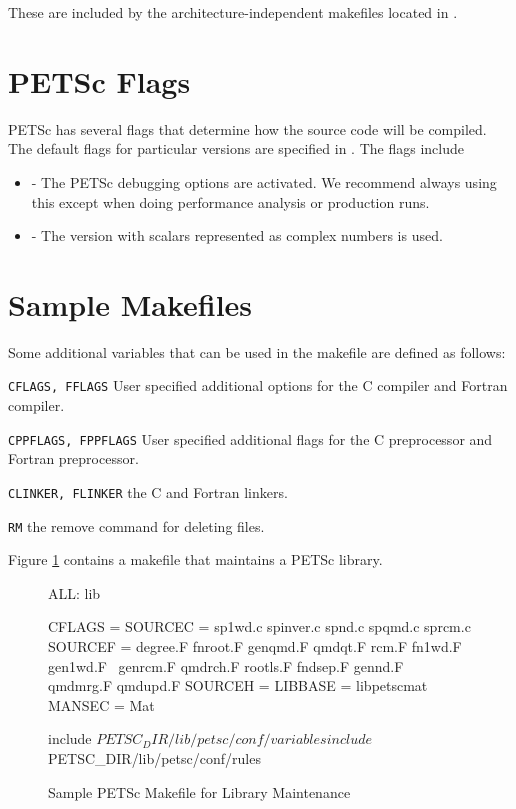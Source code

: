 These are included by the architecture-independent makefiles located in
.

\section{PETSc Flags}
\label{sec_makeflags}

PETSc has several flags that determine how the source code will be
compiled.  The default flags for particular versions are specified in
.
The flags include
\begin{itemize}
\item {} - The PETSc debugging options are activated. We
      recommend always using this except when doing performance analysis or production runs. 
\item {} - The version with scalars represented
      as complex numbers is used. 
\end{itemize}

\section{Sample Makefiles}


Some additional variables that can be used in the makefile are defined
as follows:
\begin{tightitemize}
\item \lstinline{CFLAGS, FFLAGS} User specified additional options for the C compiler and
        Fortran compiler.
\item \lstinline{CPPFLAGS, FPPFLAGS} User specified additional flags for the C preprocessor
        and Fortran preprocessor.
\item \lstinline{CLINKER, FLINKER} the C and Fortran linkers.
\item \lstinline{RM} the remove command for deleting files.
\end{tightitemize}

Figure \ref{fig_make3} contains a makefile that maintains a PETSc
library.  
\begin{figure}[H]
\begin{makelisting}
ALL: lib

CFLAGS   =
SOURCEC  = sp1wd.c spinver.c spnd.c spqmd.c sprcm.c
SOURCEF  = degree.F  fnroot.F genqmd.F qmdqt.F rcm.F fn1wd.F gen1wd.F \
          genrcm.F qmdrch.F rootls.F fndsep.F gennd.F qmdmrg.F qmdupd.F
SOURCEH  =
LIBBASE  = libpetscmat
MANSEC   = Mat

include ${PETSC_DIR}/lib/petsc/conf/variables
include ${PETSC_DIR}/lib/petsc/conf/rules
\end{makelisting}
\caption{Sample PETSc Makefile for Library Maintenance}
\label{fig_make3}
\end{figure}

